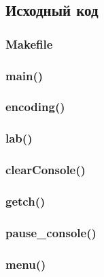 \documentclass[12pt, a4paper]{article}
\begin{document}
\subsection{Исходный код}

\subsubsection{Makefile}


\subsubsection{main()}



\subsubsection{encoding()}



\subsubsection{lab()}



\subsubsection{clearConsole()}



\subsubsection{getch()}



\subsubsection{pause\_console()}



\subsubsection{menu()}


\end{document}
